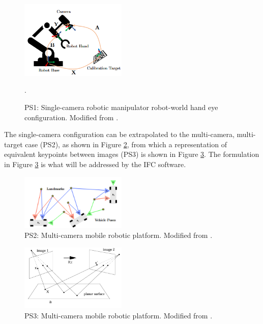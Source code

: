 \documentclass[12pt]{article}
\begin{document}
\begin{figure}[h!]
  \begin{center}
  \centering\includegraphics[width=0.45\textwidth]{Images/Wang_EOH.png}
  \caption{PS1: Single-camera robotic manipulator robot-world hand eye 
  configuration. Modified from \cite{Wang_2022}.}.
  \label{Wang_EOH}
  \end{center}
\end{figure}
\noindent The single-camera configuration can be extrapolated to the multi-camera, multi-target case (PS2), as shown in Figure \ref{OASIS}, from which a representation of equivalent keypoints between images (PS3) is shown in Figure \ref{MV_HZ}. The formulation in Figure \ref{MV_HZ} is what will be addressed by the IFC software.\\

\begin{figure}[h!]
  \begin{center}
  \centering\includegraphics[width=0.45\textwidth]{Images/OASIS_RevVar.png}
  \caption{PS2: Multi-camera mobile robotic platform. 
  Modified from \cite{OASIS_2024}.}
  \label{OASIS}
  \end{center}
\end{figure}


\begin{figure}[h!]
  \begin{center}
  \centering\includegraphics[width=0.45\textwidth]{Images/MULTIVIEW.png}
  \caption{PS3: Multi-camera mobile robotic platform. 
  Modified from \cite{Hartley_Zisserman}.}
  \label{MV_HZ}
  \end{center}
\end{figure}
\end{document}
